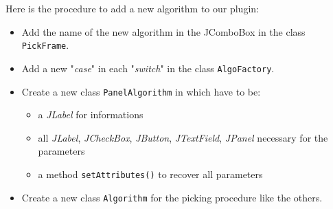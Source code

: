 

Here is the procedure to add a new algorithm to our plugin:

\begin{itemize}
\item Add the name of the new algorithm in the JComboBox in the class \texttt{PickFrame}.
\item Add a new "\textit{case}" in each "\textit{switch}" in the class \texttt{AlgoFactory}.
\item Create a new class \texttt{PanelAlgorithm} in which have to be:
	\begin{itemize}
	\item a \emph{JLabel} for informations
	\item all \emph{JLabel}, \emph{JCheckBox}, \emph{JButton}, \emph{JTextField}, \emph{JPanel} necessary for the parameters
	\item a method \texttt{setAttributes()} to recover all parameters
	\end{itemize}
\item Create a new class \texttt{Algorithm} for the picking procedure like the others.
\end{itemize}




	
	
	











